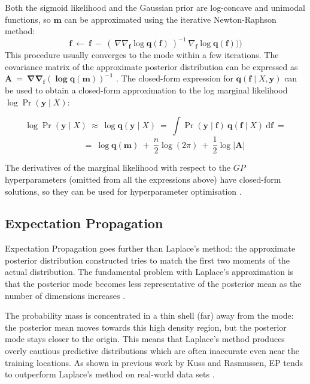 \documentclass[a4paper,12pt ]{report}
\renewcommand{\GP}{{GP}}
\begin{document}
Both the sigmoid likelihood and the Gaussian prior are log-concave and unimodal functions, so $\mathbf{m}$ can be approximated using the iterative Newton-Raphson method:
\begin{equation*} \mathbf{f} ~\gets~ \mathbf{f} ~-~ (~ \nabla \nabla_{\mathbf{f}} \log \mathbf{q}(\mathbf{f})~)^{-1} ~ \nabla_{\mathbf{f}} \log \mathbf{q}(\mathbf{f}))  )  \end{equation*}
This procedure usually converges to the mode within a few iterations. The covariance matrix of the approximate posterior distribution can be expressed as $ \mathbf{A} ~=~ \mathbf{\nabla \nabla_{\mathbf{f}} (\log \mathbf{q}(\mathbf{m}))^{-1}}$ \cite{gpcinference}. The closed-form expression for $ \mathbf{q}(\mathbf{f} \mid X, \mathbf{y} )$ can be used to obtain a closed-form approximation to the log marginal likelihood $\log \Pr(\mathbf{y} \mid X)$:

\begin{equation*} \log \Pr(\mathbf{y} \mid X) ~\approx~ \log \mathbf{q}(\mathbf{y}\mid X) ~=~ \int{ \Pr(\mathbf{y} \mid \mathbf{f}) ~ \mathbf{q}(\mathbf{f} \mid X) ~ \mathrm{d}\mathbf{f} } ~ = \end{equation*}
\begin{equation*}  ~~~~~~~~~ = ~ \log \mathbf{q}(\mathbf{m}) ~+~ \frac{n}{2}\log(2\pi) ~+~ \frac{1}{2}\log |\mathbf{A}|  \end{equation*}

The derivatives of the marginal likelihood with respect to the $\GP$ hyperparameters (omitted from all the expressions above) have closed-form solutions, so they can be used for hyperparameter optimisation \cite{gpcapprox}.

\subsection{Expectation Propagation}

Expectation Propagation goes further than Laplace's method: the approximate posterior distribution constructed tries to match the first two moments of the actual distribution. The fundamental problem with Laplace's approximation is that the posterior mode becomes less representative of the posterior mean as the number of dimensions increases \cite{gpcapprox, gpcinference}.

The probability mass is concentrated in a thin shell (far) away from the mode: the posterior mean moves towards this high density region, but the posterior mode stays closer to the origin. This means that Laplace's method produces overly cautious predictive distributions which are often inaccurate even near the training locations. As shown in previous work by Kuss and Rasmussen, EP tends to outperform Laplace's method on real-world data sets \cite{gpcapprox, gpcinference}.
\end{document}
